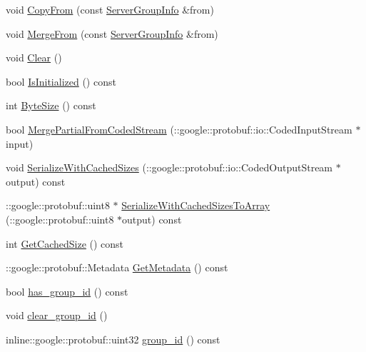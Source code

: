 \begin{DoxyCompactItemize}
void \hyperlink{class_i_m_1_1_base_define_1_1_server_group_info_ad0b0f7f0f71f90431e4563fb20881bf5}{Copy\+From} (const \hyperlink{class_i_m_1_1_base_define_1_1_server_group_info}{Server\+Group\+Info} \&from)
\item 
void \hyperlink{class_i_m_1_1_base_define_1_1_server_group_info_aec44b6b068b7c7c859027a5db3c2a0bb}{Merge\+From} (const \hyperlink{class_i_m_1_1_base_define_1_1_server_group_info}{Server\+Group\+Info} \&from)
\item 
void \hyperlink{class_i_m_1_1_base_define_1_1_server_group_info_a3f1810fcea25befb9731aa8556d6db20}{Clear} ()
\item 
bool \hyperlink{class_i_m_1_1_base_define_1_1_server_group_info_a48d178afb5cd1d0220faf1fdcafdb527}{Is\+Initialized} () const 
\item 
int \hyperlink{class_i_m_1_1_base_define_1_1_server_group_info_abd3985c5186358cabd1ff4a49f9e49e4}{Byte\+Size} () const 
\item 
bool \hyperlink{class_i_m_1_1_base_define_1_1_server_group_info_a725e636204dbb9086176316c274b9a9a}{Merge\+Partial\+From\+Coded\+Stream} (\+::google\+::protobuf\+::io\+::\+Coded\+Input\+Stream $\ast$input)
\item 
void \hyperlink{class_i_m_1_1_base_define_1_1_server_group_info_aee21219e908fffebbdcc9ea5777b98f0}{Serialize\+With\+Cached\+Sizes} (\+::google\+::protobuf\+::io\+::\+Coded\+Output\+Stream $\ast$output) const 
\item 
\+::google\+::protobuf\+::uint8 $\ast$ \hyperlink{class_i_m_1_1_base_define_1_1_server_group_info_a6c8e25c9bfcfc053a60b253619f021e4}{Serialize\+With\+Cached\+Sizes\+To\+Array} (\+::google\+::protobuf\+::uint8 $\ast$output) const 
\item 
int \hyperlink{class_i_m_1_1_base_define_1_1_server_group_info_a8d9d554ebab7bf60c226073da9760726}{Get\+Cached\+Size} () const 
\item 
\+::google\+::protobuf\+::\+Metadata \hyperlink{class_i_m_1_1_base_define_1_1_server_group_info_abb4c018e826980f3c5415aa0b3486fb5}{Get\+Metadata} () const 
\item 
bool \hyperlink{class_i_m_1_1_base_define_1_1_server_group_info_a1bd52abfe7c77473eaf62fb7ee11c672}{has\+\_\+group\+\_\+id} () const 
\item 
void \hyperlink{class_i_m_1_1_base_define_1_1_server_group_info_a37553ea49ccaaef8ef5281389ecb3dca}{clear\+\_\+group\+\_\+id} ()
\item 
inline\+::google\+::protobuf\+::uint32 \hyperlink{class_i_m_1_1_base_define_1_1_server_group_info_af64b158d00806b3d7d0c83355282db13}{group\+\_\+id} () const 

\end{DoxyCompactItemize}
